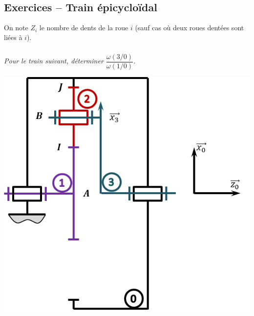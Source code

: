 \documentclass[10pt,fleqn]{article} %
\begin{document}
\def\pathfig{images}

\vspace{4.5cm}
\pagestyle{fancy}
\thispagestyle{plain}

\def\columnseprulecolor{\color{ocre}}
\setlength{\columnseprule}{0.4pt} 

\def\pathfig{images}

\ifprof
\else
\begin{multicols}{2}
\fi


\section*{Exercices -- Train épicycloïdal}
\setcounter{subparagraph}{0}
On note $Z_i$ le nombre de dents de la roue $i$ (sauf cas où deux roues dentées sont liées à $i$).
\subparagraph{}\textit{Pour le train suivant, déterminer $\dfrac{\omega(3/0)}{\omega(1/0)}$.}
\begin{center}
\includegraphics[width=\linewidth]{images/train_01}
\end{center}



\end{multicols}
\end{document}
